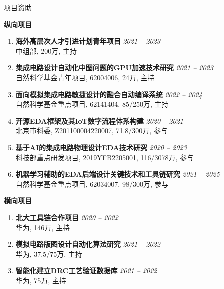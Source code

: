 
\begin{rSection}{项目资助}


\textbf{纵向项目}
        
\begin{enumerate}[font=\normalfont]

\item
{\bf 海外高层次人才引进计划青年项目 } \hfill{\em 2021 -- 2023} \\
中组部, 200万, 主持

\item 
{\bf 集成电路设计自动化中图问题的GPU加速技术研究 } \hfill{\em 2021 -- 2023} \\
自然科学基金青年项目, 62004006, 24万, 主持

\item 
{\bf 面向模拟集成电路敏捷设计的融合自动编译系统 } \hfill{\em 2022 -- 2024} \\
自然科学基金重点项目, 62141404, 85/250万, 主持

\item 
{\bf 开源EDA框架及其IoT数字流程体系构建 } \hfill{\em 2020 -- 2021} \\
北京市科委, Z201100004220007, 71.8/300万, 参与

\item 
{\bf 基于AI的集成电路物理设计EDA技术研究 } \hfill{\em 2020 -- 2023} \\
科技部重点研发项目, 2019YFB2205001, 116/3078万, 参与

\item 
{\bf 机器学习辅助的EDA后端设计关键技术和工具链研究 } \hfill{\em 2021 -- 2025} \\
自然科学基金重点项目, 62034007, 98/300万, 参与

\end{enumerate}
    
\textbf{横向项目}
        
\begin{enumerate}[font=\normalfont]

\item 
{\bf 北大工具链合作项目 } \hfill{\em 2020 -- 2022} \\
华为, 146万, 主持

\item 
{\bf 模拟电路版图设计自动化算法研究 } \hfill{\em 2021 -- 2022} \\
华为, 37.5/75万, 主持

\item 
{\bf 智能化建立DRC工艺验证数据库 } \hfill{\em 2021 -- 2022} \\
华为, 75万, 主持

\end{enumerate}

\end{rSection}
